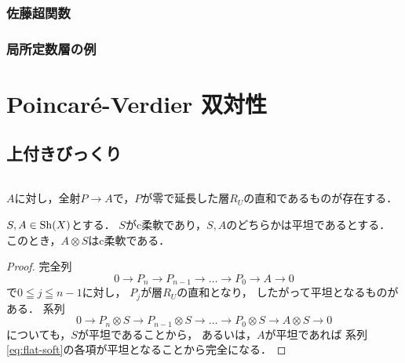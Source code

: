 \subsection{佐藤超関数}\label{ssec:sato}
\subsection{局所定数層の例}



\chapter{Poincar\'e-Verdier 双対性}

\section{上付きびっくり}
\subparagraph{\cite[V, 6.1]{B+84}}
\(A\)に対し，全射\(P\to{A}\)で，\(P\)が零で延長した層\(R_U\)の直和であるものが存在する．
\begin{LMM}\cite[{V. Proposition 6.5}]{B+84}
    \(S,A\in\mathrm{Sh}(X)\)とする．
    \(S\)がc柔軟であり，\(S,A\)のどちらかは平坦であるとする．
    このとき，\(A\otimes S\)はc柔軟である．
\end{LMM}
\begin{proof}
    完全列\begin{equation}\label{eq:flat-soft}
        0\to{P_{n}}\to{P_{n-1}}\to\dots\to{P_{0}}\to{A}\to0
    \end{equation}
    で\(0\leqq{j}\leqq{n-1}\)に対し，
    \({P_{j}}\)が層\(R_U\)の直和となり，
    したがって平坦となるものがある．
    系列
    \begin{equation}
        0\to{P_{n}}\otimes{S}\to{P_{n-1}}\otimes{S}
        \to\dots\to{P_{0}}\otimes{S}\to{A}\otimes{S}\to0
    \end{equation}
    についても，\(S\)が平坦であることから，
    あるいは，\(A\)が平坦であれば
    系列\eqref{eq:flat-soft}の各項が平坦となることから完全になる．

\end{proof}

